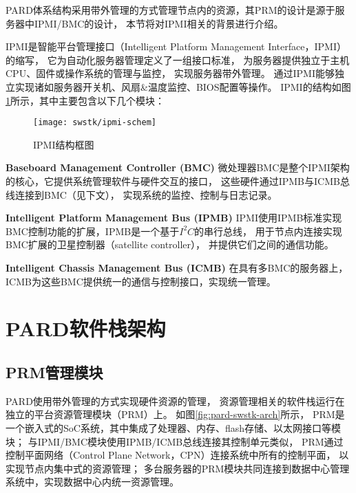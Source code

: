 PARD体系结构采用带外管理的方式管理节点内的资源，其PRM的设计是源于服务器中IPMI/BMC的设计，
本节将对IPMI相关的背景进行介绍。

IPMI是智能平台管理接口（Intelligent Platform Management Interface，IPMI）的缩写，
它为自动化服务器管理定义了一组接口标准\cite{ipmi}，
为服务器提供独立于主机CPU、固件或操作系统的管理与监控，
实现服务器带外管理。
通过IPMI能够独立实现诸如服务器开关机、风扇\&温度监控、BIOS配置等操作。
IPMI的结构如图\ref{fig:ipmi-schem}所示，其中主要包含以下几个模块：

\begin{figure}[tb]
  \centering
  \texttt{[image: swstk/ipmi-schem]}
  \caption{IPMI结构框图}
  \label{fig:ipmi-schem}
\end{figure}

\textbf{Baseboard Management Controller (BMC)}\quad
微处理器BMC是整个IPMI架构的核心，它提供系统管理软件与硬件交互的接口，
这些硬件通过IPMB与ICMB总线连接到BMC（见下文），
实现系统的监控、控制与日志记录。

\textbf{Intelligent Platform Management Bus (IPMB)}\quad
IPMI使用IPMB标准实现BMC控制功能的扩展，IPMB是一个基于$I^2C$的串行总线，
用于节点内连接实现BMC扩展的卫星控制器（satellite controller），
并提供它们之间的通信功能。

\textbf{Intelligent Chassis Management Bus (ICMB)}\quad
在具有多BMC的服务器上，ICMB为这些BMC提供统一的通信与控制接口，实现统一管理。


\section{PARD软件栈架构}

\subsection{PRM管理模块}
\label{chap:prm:arch}

PARD使用带外管理的方式实现硬件资源的管理，
资源管理相关的软件栈运行在独立的平台资源管理模块（PRM）上。
如图\ref{fig:pard-swstk-arch}所示，
PRM是一个嵌入式的SoC系统，其中集成了处理器、内存、flash存储、以太网接口等模块；
与IPMI/BMC模块使用IPMB/ICMB总线连接其控制单元类似，
PRM通过控制平面网络（Control Plane Network，CPN）连接系统中所有的控制平面，
以实现节点内集中式的资源管理；
多台服务器的PRM模块共同连接到数据中心管理系统中，实现数据中心内统一资源管理。

